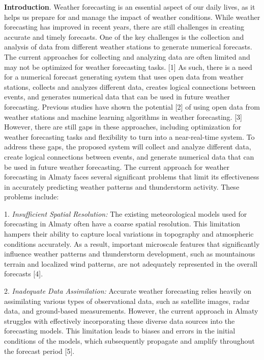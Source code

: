 \begin{multicols}{2}
{\bfseries Introduction}. Weather forecasting is an essential aspect of our
daily lives, as it helps us prepare for and manage the impact of weather
conditions. While weather forecasting has improved in recent years,
there are still challenges in creating accurate and timely forecasts.
One of the key challenges is the collection and analysis of data from
different weather stations to generate numerical forecasts. The current
approaches for collecting and analyzing data are often limited and may
not be optimized for weather forecasting tasks. {[}1{]} As such, there
is a need for a numerical forecast generating system that uses open data
from weather stations, collects and analyzes different data, creates
logical connections between events, and generates numerical data that
can be used in future weather forecasting. Previous studies have shown
the potential {[}2{]} of using open data from weather stations and
machine learning algorithms in weather forecasting. {[}3{]} However,
there are still gaps in these approaches, including optimization for
weather forecasting tasks and flexibility to turn into a near-real-time
system. To address these gaps, the proposed system will collect and
analyze different data, create logical connections between events, and
generate numerical data that can be used in future weather forecasting.
The current approach for weather forecasting in Almaty faces several
significant problems that limit its effectiveness in accurately
predicting weather patterns and thunderstorm activity. These problems
include:

1. \emph{Insufficient Spatial Resolution:} The existing meteorological
models used for forecasting in Almaty often have a coarse spatial
resolution. This limitation hampers their ability to capture local
variations in topography and atmospheric conditions accurately. As a
result, important microscale features that significantly influence
weather patterns and thunderstorm development, such as mountainous
terrain and localized wind patterns, are not adequately represented in
the overall forecasts {[}4{]}.

2. \emph{Inadequate Data Assimilation:} Accurate weather forecasting
relies heavily on assimilating various types of observational data,
such as satellite images, radar data, and ground-based measurements.
However, the current approach in Almaty struggles with effectively
incorporating these diverse data sources into the forecasting models.
This limitation leads to biases and errors in the initial conditions
of the models, which subsequently propagate and amplify throughout the
forecast period {[}5{]}.


\end{multicols}
